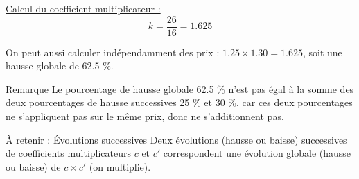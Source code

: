 \documentclass[xcolor={dvipsnames}]{beamer}
\begin{document}
\begin{frame}{}

\underline{Calcul du coefficient multiplicateur :}
\begin{equation*}
k = \dfrac{26}{16} = \num{1.625}
\end{equation*}\pause

On peut aussi calculer indépendamment des prix : $\num{1.25} \times \num{1.30} = \num{1.625}$, soit une hausse globale de \num{62.5} \%. \pause

\begin{block}{Remarque}
Le pourcentage de hausse globale \num{62.5} \% n'est pas égal à la somme des deux pourcentages de hausse successives \num{25} \% et \num{30} \%, car ces deux pourcentages ne s'appliquent pas sur le même prix, donc ne s'additionnent pas.
\end{block}\pause

\begin{alertblock}{\`A retenir : \'Evolutions successives}
Deux évolutions (hausse ou baisse) successives de coefficients multiplicateurs $c$ et $c'$  correspondent  une évolution globale (hausse ou baisse) de $c \times c'$ (on multiplie).
\end{alertblock}



\end{frame}
\end{document}
